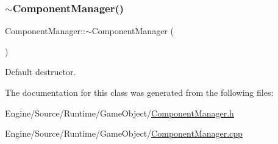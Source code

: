 \subsubsection{\texorpdfstring{$\sim$\+Component\+Manager()}{~ComponentManager()}}
{\footnotesize\ttfamily Component\+Manager\+::$\sim$\+Component\+Manager (\begin{DoxyParamCaption}{ }\end{DoxyParamCaption})}

Default destructor. 

The documentation for this class was generated from the following files\+:\begin{DoxyCompactItemize}
\item 
Engine/\+Source/\+Runtime/\+Game\+Object/\mbox{\hyperlink{_component_manager_8h}{Component\+Manager.\+h}}\item 
Engine/\+Source/\+Runtime/\+Game\+Object/\mbox{\hyperlink{_component_manager_8cpp}{Component\+Manager.\+cpp}}\end{DoxyCompactItemize}
